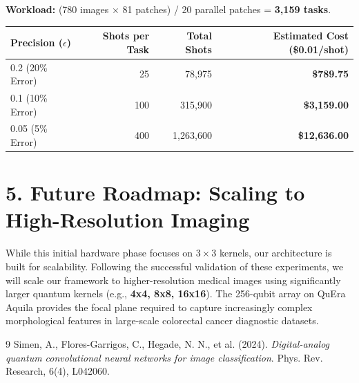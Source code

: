 \documentclass[11pt,a4paper]{article}
\begin{document}
\textbf{Workload:} (780 images $\times$ 81 patches) / 20 parallel patches = \textbf{3,159 tasks}.

\begin{table}[h]
    \centering
    \begin{tabular}{lrrr}
        \toprule
        Precision ($\epsilon$) & Shots per Task & Total Shots & \textbf{Estimated Cost (\$0.01/shot)} \\
        \midrule
        0.2 (20\% Error) & 25 & 78,975 & \textbf{\$789.75} \\
        0.1 (10\% Error) & 100 & 315,900 & \textbf{\$3,159.00} \\
        0.05 (5\% Error) & 400 & 1,263,600 & \textbf{\$12,636.00} \\
        \bottomrule
    \end{tabular}
\end{table}

\section*{5. Future Roadmap: Scaling to High-Resolution Imaging}
While this initial hardware phase focuses on $3\times3$ kernels, our architecture is built for scalability. Following the successful validation of these experiments, we will scale our framework to higher-resolution medical images using significantly larger quantum kernels (e.g., \textbf{4x4, 8x8, 16x16}). The 256-qubit array on QuEra Aquila provides the focal plane required to capture increasingly complex morphological features in large-scale colorectal cancer diagnostic datasets.

\begin{thebibliography}{9}
Simen, A., Flores-Garrigos, C., Hegade, N. N., et al. (2024). \textit{Digital-analog quantum convolutional neural networks for image classification}. Phys. Rev. Research, 6(4), L042060.
\end{thebibliography}
\end{document}
